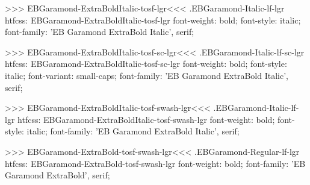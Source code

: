 >>>
\<EBGaramond-ExtraBoldItalic-tosf-lgr\><<<
.EBGaramond-Italic-lf-lgr
htfcss:  EBGaramond-ExtraBoldItalic-tosf-lgr  font-weight: bold; font-style: italic; font-family: 'EB Garamond ExtraBold Italic', serif;

>>>
\<EBGaramond-ExtraBoldItalic-tosf-sc-lgr\><<<
.EBGaramond-Italic-lf-sc-lgr
htfcss:  EBGaramond-ExtraBoldItalic-tosf-sc-lgr  font-weight: bold; font-style: italic; font-variant: small-caps; font-family: 'EB Garamond ExtraBold Italic', serif;

>>>
\<EBGaramond-ExtraBoldItalic-tosf-swash-lgr\><<<
.EBGaramond-Italic-lf-lgr
htfcss:  EBGaramond-ExtraBoldItalic-tosf-swash-lgr  font-weight: bold; font-style: italic; font-family: 'EB Garamond ExtraBold Italic', serif;

>>>
\<EBGaramond-ExtraBold-tosf-swash-lgr\><<<
.EBGaramond-Regular-lf-lgr
htfcss:  EBGaramond-ExtraBold-tosf-swash-lgr  font-weight: bold; font-family: 'EB Garamond ExtraBold', serif;


